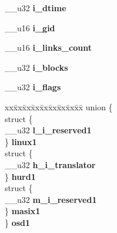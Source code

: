 \begin{DoxyCompactItemize}
\+\_\+\+\_\+u32 {\bfseries i\+\_\+dtime}
\item 
\mbox{\label{structext2__inode_a70a897002874e527bb46400cdf269518}} 
\+\_\+\+\_\+u16 {\bfseries i\+\_\+gid}
\item 
\mbox{\label{structext2__inode_afb0d95fe06af50809b895004e4856753}} 
\+\_\+\+\_\+u16 {\bfseries i\+\_\+links\+\_\+count}
\item 
\mbox{\label{structext2__inode_a6c54254e1da9331425ef4cddb96f2494}} 
\+\_\+\+\_\+u32 {\bfseries i\+\_\+blocks}
\item 
\mbox{\label{structext2__inode_ae33991242e2b1381cddd6c3347094322}} 
\+\_\+\+\_\+u32 {\bfseries i\+\_\+flags}
\item 
\mbox{\label{structext2__inode_a3692ec75238841bd6a550b0edc33f2d7}} 
\begin{tabbing}
xx\=xx\=xx\=xx\=xx\=xx\=xx\=xx\=xx\=\kill
union \{\\
\>struct \{\\
\>\>\_\_u32 {\bfseries l\_i\_reserved1}\\
\>\} {\bfseries linux1}\\
\>struct \{\\
\>\>\_\_u32 {\bfseries h\_i\_translator}\\
\>\} {\bfseries hurd1}\\
\>struct \{\\
\>\>\_\_u32 {\bfseries m\_i\_reserved1}\\
\>\} {\bfseries masix1}\\
\} {\bfseries osd1}\\


\end{tabbing}
\end{DoxyCompactItemize}

